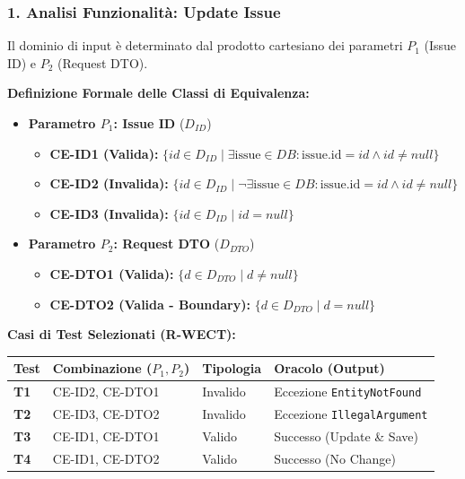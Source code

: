 \documentclass[a4paper,12pt]{article}
\begin{document}
\vspace{0.5cm}

\subsubsection*{1. Analisi Funzionalità: Update Issue}
Il dominio di input è determinato dal prodotto cartesiano dei parametri $P_1$ (Issue ID) e $P_2$ (Request DTO).

\textbf{Definizione Formale delle Classi di Equivalenza:}
\begin{itemize}
    \item \textbf{Parametro $P_1$: Issue ID} ($D_{ID}$)
    \begin{itemize}
        \item \textbf{CE-ID1 (Valida):} $\{ id \in D_{ID} \mid \exists \text{issue} \in DB : \text{issue.id} = id \land id \neq null \}$
        \item \textbf{CE-ID2 (Invalida):} $\{ id \in D_{ID} \mid \neg \exists \text{issue} \in DB : \text{issue.id} = id \land id \neq null \}$
        \item \textbf{CE-ID3 (Invalida):} $\{ id \in D_{ID} \mid id = null \}$
    \end{itemize}
    
    \item \textbf{Parametro $P_2$: Request DTO} ($D_{DTO}$)
    \begin{itemize}
        \item \textbf{CE-DTO1 (Valida):} $\{ d \in D_{DTO} \mid d \neq null \}$
        \item \textbf{CE-DTO2 (Valida - Boundary):} $\{ d \in D_{DTO} \mid d = null \}$
    \end{itemize}
\end{itemize}

\textbf{Casi di Test Selezionati (R-WECT):}
\renewcommand{\arraystretch}{1.5}
\begin{longtable}{|p{1.0cm}|p{4.5cm}|p{3.5cm}|p{4.5cm}|}
    \hline
    \rowcolor{UninaBlue} 
    \textbf{\color{white}Test} & \textbf{\color{white}Combinazione ($P_1, P_2$)} & \textbf{\color{white}Tipologia} & \textbf{\color{white}Oracolo (Output)} \\ 
    \hline
    \textbf{T1} & CE-ID2, CE-DTO1 & Invalido & Eccezione \texttt{EntityNotFound} \\ \hline
    \textbf{T2} & CE-ID3, CE-DTO2 & Invalido & Eccezione \texttt{IllegalArgument} \\ \hline
    \textbf{T3} & CE-ID1, CE-DTO1 & Valido & Successo (Update \& Save) \\ \hline
    \textbf{T4} & CE-ID1, CE-DTO2 & Valido & Successo (No Change) \\ \hline
\end{longtable}
\end{document}
